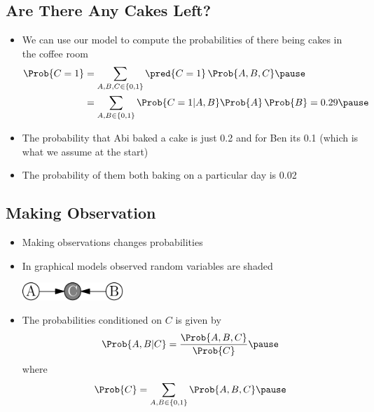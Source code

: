 
\begin{slide}
\section{Are There Any Cakes Left?}

\begin{PauseHighLight}
  \begin{itemize}
  \item We can use our model to compute the probabilities of there
    being cakes in the coffee room
    \begin{align*}
      \Prob{C=1} &= \sum_{A,B,C\in\{0,1\}}
                   \pred{C=1}\, \Prob{A,B,C} \pause \\
      &= \sum_{A,B\in\{0,1\}}
       \Prob{C=1|A,B} \Prob{A}\,\Prob{B} = 0.29\pause
    \end{align*}
  \item The probability that Abi baked a cake is just 0.2 and for Ben
    its 0.1 (which is what we assume at the start)\pause
  \item The probability of them both baking on a particular day is 0.02\pause
  \end{itemize}
\end{PauseHighLight}

\end{slide}


\begin{slide}
\section{Making Observation}

\begin{PauseHighLight}
  \begin{itemize}
  \item Making observations changes probabilities\pause
  \item In graphical models observed random variables are shaded
    \begin{center}
      \includegraphics[width=0.3\textwidth]{figures/acob.pdf}\pause
    \end{center}
  \item The probabilities conditioned on $C$ is given by
    $$ \Prob{A,B|C} =\frac{\Prob{A,B,C}}{\Prob{C}} \pause $$
    where
    $$ \Prob{C} = \sum_{A,B\in\{0,1\}} \Prob{A,B,C} \pause $$
  \end{itemize}
\end{PauseHighLight}

\end{slide}


